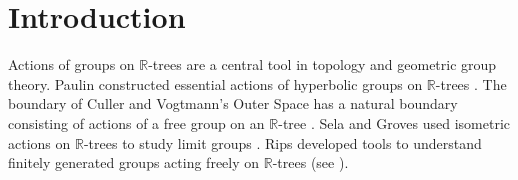 \documentclass[12pt, leqno]{amsart}
\newcommand{\bbr}{\mathbb{R}}
\theoremstyle{definition}\newtheorem{definition}[theorem]{Definition}
\begin{document}
\begin{abstract}


A map $p:E\to X$ has the \emph{unique path lifting} property if every path in $X$, after a choice of an initial point, lifts uniquely to a path in $E$.  We prove that if a group $G$ acts on an $\mathbb R$-tree $T$ such that the quotient map $p: T\to T/G$ has the unique path lifting property, then the quotient space $T/G$ does not contain a disc.  As a consequence, we show that every map of manifolds with the unique path lifting property is a covering map.  The proof requires a study of one-dimensional backtracking in paths.   We show the surprising  and counterintuitive result that the equivalence relation given by homotopies of paths rel.\ endpoints is generated by inserting and deleting one-dimensional backtracking.
\end{abstract}

\maketitle



\section{Introduction}
Actions of groups on $\mathbb R$-trees are a central tool in topology and geometric group theory.  Paulin constructed essential actions of  hyperbolic groups on $\mathbb R$-trees \cite{Paulin1988}.  The boundary of Culler and Vogtmann's Outer Space has a natural boundary consisting of actions of a free group on an $\mathbb R$-tree  \cite[Section 2]{BestvinaFeighn1994}.  Sela and Groves used isometric actions on $\mathbb R$-trees to study limit groups \cite{Groves2009, Sela2001}.  Rips developed tools to understand finitely generated groups acting freely on $\mathbb R$-trees (see \cite{BestvinaFeighn1995, GaboriauLevittPaulin1994}).
\end{document}
